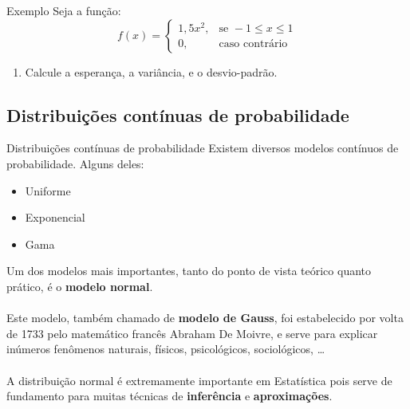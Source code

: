 \documentclass[10pt]{beamer}\usepackage[]{graphicx}\usepackage[]{color}
\providecommand{\E}{\text{E}}
\providecommand{\Var}{\text{Var}}
\theoremstyle{definition}
\begin{document}

\begin{frame}[fragile]{Exemplo}
  Seja a função:
  \[
    f(x)=
    \begin{cases}
      1,5 x^2, & \text{se } -1 \leq x \leq 1 \\
      0,              & \text{caso contrário}
    \end{cases}
  \]
  \begin{enumerate}
  \item Calcule a esperança, a variância, e o desvio-padrão.
  \end{enumerate}
\end{frame}


\subsection[Distribuições Contínuas]{Distribuições contínuas de
  probabilidade}

\begin{frame}[fragile]{Distribuições contínuas de probabilidade}
  Existem diversos modelos contínuos de probabilidade. Alguns deles:
  \begin{itemize}
  \item Uniforme
  \item Exponencial
  \item Gama
  \end{itemize}
  \vspace{1em}
  Um dos modelos mais importantes, tanto do ponto de vista teórico
  quanto prático, é o \textbf{modelo normal}. \\~\\
  Este modelo, também chamado de \textbf{modelo de Gauss}, foi
  estabelecido por volta de 1733 pelo matemático francês Abraham De
  Moivre, e serve para explicar inúmeros fenômenos naturais, físicos,
  psicológicos, sociológicos, \ldots \\~\\
  A distribuição normal é extremamente importante em Estatística pois
  serve de fundamento para muitas técnicas de \textbf{inferência} e
  \textbf{aproximações}.
\end{frame}

\end{document}
